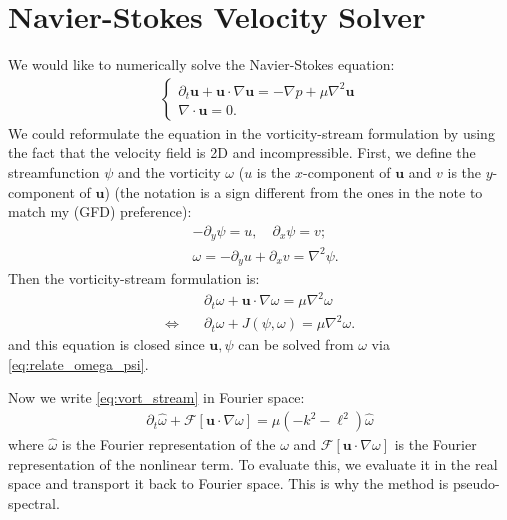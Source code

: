 \documentclass[11pt,letterpaper]{article}
\newcommand{\pe}{\partial}
\newcommand{\ve}[1]{\boldsymbol{#1}}
\newcommand{\fff}{\iff\quad}
\begin{document}
\renewcommand\thesection{\arabic{section}.}
\renewcommand\thesubsection{(\arabic{section}.\alph{subsection})}

\thispagestyle{fancyplain}
\section{Navier-Stokes Velocity Solver}
We would like to numerically solve the Navier-Stokes equation:
\begin{align*}
    \begin{cases}
    \pe_t\ve u+\ve u\cdot\nabla\ve u=-\nabla p+\mu\nabla^2\ve u\\
    \nabla\cdot\ve u = 0.
    \end{cases}
\end{align*}
We could reformulate the equation in the vorticity-stream formulation by using the fact that the velocity field is 2D and incompressible. First, we define the streamfunction $\psi$ and the vorticity $\omega$ ($u$ is the $x$-component of $\ve u$ and $v$ is the $y$-component of $\ve u$) (the notation is a sign different from the ones in the note to match my (GFD) preference):
\begin{align}
    &-\pe_y \psi = u,\quad  \pe_x \psi = v;\nonumber\\
    &\omega = -\pe_y u+\pe_x v = \nabla^2 \psi.\label{eq:relate_omega_psi}
\end{align}
Then the vorticity-stream formulation is:
\begin{align}
    &\pe_t\omega+\ve u\cdot\nabla\omega = \mu\nabla^2\omega\label{eq:vort_stream}\\
    \fff&\pe_t\omega+J(\psi,\omega) = \mu\nabla^2\omega\nonumber.
\end{align}
and this equation is closed since $\ve u,\psi$ can be solved from $\omega$ via \eqref{eq:relate_omega_psi}.

Now we write \eqref{eq:vort_stream} in Fourier space:
\begin{align}
    \pe_t\hat\omega+\mathcal{F}[\ve u\cdot\nabla\omega] = \mu(-k^2-\ell^2)\hat\omega\label{eq:eq_spectral}
\end{align}
where $\hat\omega$ is the Fourier representation of the $\omega$ and $\mathcal{F}[\ve u\cdot\nabla\omega]$ is the Fourier representation of the nonlinear term. To evaluate this, we evaluate it in the real space and transport it back to Fourier space. This is why the method is pseudo-spectral.
\end{document}
